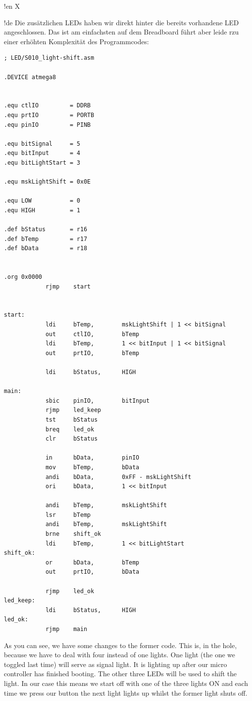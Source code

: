 !en X

!de Die zusätzlichen LEDs haben wir direkt hinter die bereits vorhandene LED angeschlossen. Das ist am einfachsten auf dem Breadboard führt aber leide rzu einer erhöhten Komplexität des Programmcodes:

\begin{lstlisting}
; LED/S010_light-shift.asm

.DEVICE atmega8


.equ ctlIO         = DDRB
.equ prtIO         = PORTB
.equ pinIO         = PINB

.equ bitSignal     = 5
.equ bitInput      = 4
.equ bitLightStart = 3

.equ mskLightShift = 0x0E

.equ LOW           = 0
.equ HIGH          = 1

.def bStatus       = r16
.def bTemp         = r17
.def bData         = r18


.org 0x0000
            rjmp    start


start:
            ldi     bTemp,        mskLightShift | 1 << bitSignal
            out     ctlIO,        bTemp
            ldi     bTemp,        1 << bitInput | 1 << bitSignal
            out     prtIO,        bTemp

            ldi     bStatus,      HIGH

main:
            sbic    pinIO,        bitInput
            rjmp    led_keep
            tst     bStatus
            breq    led_ok
            clr     bStatus

            in      bData,        pinIO
            mov     bTemp,        bData
            andi    bData,        0xFF - mskLightShift
            ori     bData,        1 << bitInput

            andi    bTemp,        mskLightShift
            lsr     bTemp
            andi    bTemp,        mskLightShift
            brne    shift_ok
            ldi     bTemp,        1 << bitLightStart
shift_ok:
            or      bData,        bTemp
            out     prtIO,        bData

            rjmp    led_ok
led_keep:
            ldi     bStatus,      HIGH
led_ok:
            rjmp    main
\end{lstlisting}

As you can see, we have some changes to the former code. This is, in the hole, because we have to deal with four instead of one lights. One light (the one we toggled last time) will serve as signal light. It is lighting up after our micro controller has finished booting. The other three LEDs will be used to shift the light. In our case this means we start off with one of the three lights ON and each time we press our button the next light lights up whilst the former light shuts off.

